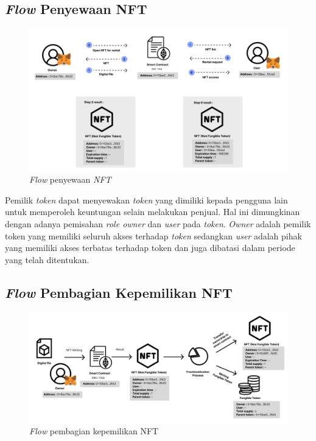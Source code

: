 \subsection{\emph{Flow} Penyewaan NFT}

\begin{figure} [H] \centering
  \includegraphics[scale=0.45]{gambar/img-nft-rental.png}
  \caption{\emph{Flow} penyewaan \emph{NFT}}
  \label{fig:Rental}
\end{figure}

Pemilik \emph{token} dapat menyewakan \emph{token} yang dimiliki kepada pengguna lain untuk memperoleh keuntungan selain melakukan penjual. Hal ini dimungkinan dengan adanya pemisahan \emph{role owner} dan \emph{user} pada \emph{token}. \emph{Owner} adalah pemilik token yang memiliki seluruh akses terhadap \emph{token} sedangkan \emph{user} adalah pihak yang memiliki akses terbatas terhadap token dan juga dibatasi dalam periode yang telah ditentukan.

\subsection{\emph{Flow} Pembagian Kepemilikan NFT}

\begin{figure} [H] \centering
  \includegraphics[scale=0.35]{gambar/img-fractional-nft.png}
  \caption{\emph{Flow} pembagian kepemilikan NFT}
  \label{fig:Fractional}
\end{figure}

